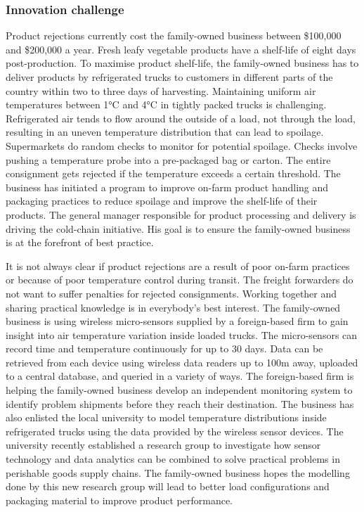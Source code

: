 \subsubsection{Innovation challenge}

Product rejections currently cost the family-owned business between \$100,000 and \$200,000 a year. Fresh leafy vegetable products have a shelf-life of eight days post-production. To maximise product shelf-life, the family-owned business has to deliver products by refrigerated trucks to customers in different parts of the country within two to three days of harvesting. Maintaining uniform air temperatures between 1\si{\degree}C and 4\si{\degree}C in tightly packed trucks is challenging. Refrigerated air tends to flow around the outside of a load, not through the load, resulting in an uneven temperature distribution that can lead to spoilage. Supermarkets do random checks to monitor for potential spoilage. Checks involve pushing a temperature probe into a pre-packaged bag or carton. The entire consignment gets rejected if the temperature exceeds a certain threshold. The business has initiated a program to improve on-farm product handling and packaging practices to reduce spoilage and improve the shelf-life of their products. The general manager responsible for product processing and delivery is driving the cold-chain initiative. His goal is to ensure the family-owned business is at the forefront of best practice. \medskip

It is not always clear if product rejections are a result of poor on-farm practices or because of poor temperature control during transit. The freight forwarders do not want to suffer penalties for rejected consignments. Working together and sharing practical knowledge is in everybody's best interest. The family-owned business is using wireless micro-sensors supplied by a foreign-based firm to gain insight into air temperature variation inside loaded trucks. The micro-sensors can record time and temperature continuously for up to 30 days. Data can be retrieved from each device using wireless data readers up to 100m away, uploaded to a central database, and queried in a variety of ways. The foreign-based firm is helping the family-owned business develop an independent monitoring system to identify problem shipments before they reach their destination. The business has also enlisted the local university to model temperature distributions inside refrigerated trucks using the data provided by the wireless sensor devices. The university recently established a research group to investigate how sensor technology and data analytics can be combined to solve practical problems in perishable goods supply chains. The family-owned business hopes the modelling done by this new research group will lead to better load configurations and packaging material to improve product performance. \medskip

